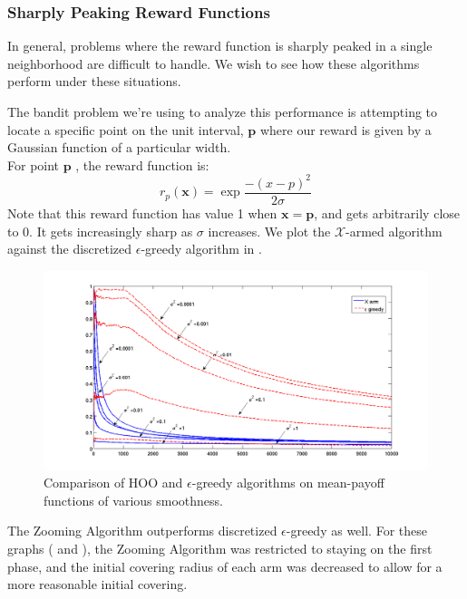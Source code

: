 \subsubsection{Sharply Peaking Reward Functions}
In general, problems where the reward function is sharply peaked in a
single neighborhood are difficult to handle. We wish to see how these
algorithms perform under these situations.

The bandit problem we're using to analyze this performance is
attempting to locate a specific point on the unit interval,
$\mathbf{p}$ where our reward is given by a Gaussian function of a
particular width.\\ For point $\mathbf{p}$ , the reward function is:
\[
	r_p(\mathbf{x}) = \exp{\frac{-(x-p)^2}{2\sigma}}
\]
Note that this reward function has value 1 when $\mathbf{x}
= \mathbf{p}$, and gets arbitrarily close to 0.  It gets increasingly
sharp as $\sigma$ increases.  We plot the $\mathcal{X}$-armed
algorithm against the discretized $\epsilon$-greedy algorithm in
.

\begin{figure}[!ht]
  \begin{center}
    \includegraphics[width=\figwidth]{figures/smoothnessComparison_linear_labelled}
     \caption{Comparison of HOO and $\epsilon$-greedy algorithms on
       mean-payoff functions of various smoothness.}
     \label{fig:smoothness2}
  \end{center}
\end{figure}

The Zooming Algorithm outperforms discretized $\epsilon$-greedy as
well.  For these graphs ( and
), the Zooming Algorithm was restricted to
staying on the first phase, and the initial covering radius of each
arm was decreased to allow for a more reasonable initial covering.


